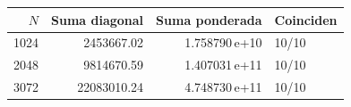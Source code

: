 \begin{center}
\small
\begin{tabular}{rrrl}
\toprule
$N$ & Suma diagonal & Suma ponderada & Coinciden \\
\midrule
1024 & 2453667.02 & 1.758790\,e+10 & 10/10 \\
2048 & 9814670.59 & 1.407031\,e+11 & 10/10 \\
3072 & 22083010.24 & 4.748730\,e+11 & 10/10 \\
\bottomrule
\end{tabular}
\end{center}
